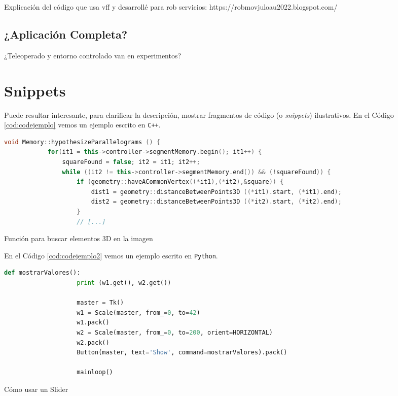 Explicación del código que usa vff y desarrollé para rob servicios: https://robmovjuloau2022.blogspot.com/





\subsection{¿Aplicación Completa?}


¿Teleoperado y entorno controlado van en experimentos?



\section{Snippets}

Puede resultar interesante, para clarificar la descripción, mostrar fragmentos de código (o \textit{snippets}) ilustrativos. En el Código \ref{cod:codejemplo} vemos un ejemplo escrito en \texttt{C++}.

\begin{code}[h]
	\begin{lstlisting}[language=C++]
		void Memory::hypothesizeParallelograms () {
			for(it1 = this->controller->segmentMemory.begin(); it1++) {
				squareFound = false; it2 = it1; it2++;
				while ((it2 != this->controller->segmentMemory.end()) && (!squareFound)) {
					if (geometry::haveACommonVertex((*it1),(*it2),&square)) {
						dist1 = geometry::distanceBetweenPoints3D ((*it1).start, (*it1).end);
						dist2 = geometry::distanceBetweenPoints3D ((*it2).start, (*it2).end);
					}
					// [...]
				\end{lstlisting}
				\caption[Función para buscar elementos 3D en la imagen]{Función para buscar elementos 3D en la imagen}
				\label{cod:codejemplo}
			\end{code}
			
			En el Código \ref{cod:codejemplo2} vemos un ejemplo escrito en \texttt{Python}.
			
			\begin{code}[h]
				\begin{lstlisting}[language=Python]
					def mostrarValores():
					print (w1.get(), w2.get())
					
					master = Tk()
					w1 = Scale(master, from_=0, to=42)
					w1.pack()
					w2 = Scale(master, from_=0, to=200, orient=HORIZONTAL)
					w2.pack()
					Button(master, text='Show', command=mostrarValores).pack()
					
					mainloop()
				\end{lstlisting}
				\caption[Cómo usar un Slider]{Cómo usar un Slider}
				\label{cod:codejemplo2}
			\end{code}
			
